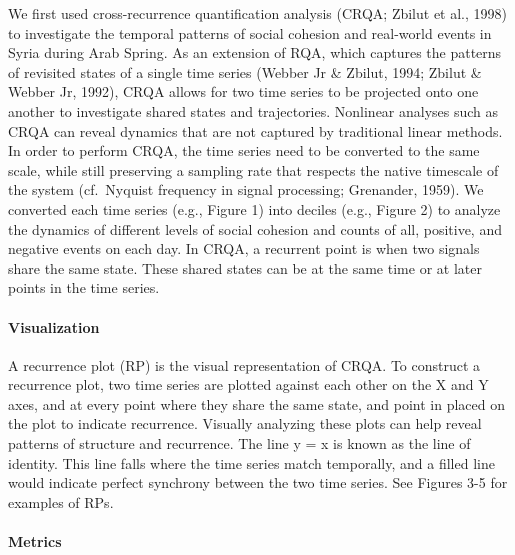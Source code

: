\documentclass[english,man]{apa6}
\begin{document}
We first used cross-recurrence quantification analysis (CRQA; Zbilut et al., 1998) to investigate the temporal patterns of social cohesion and real-world events in Syria during Arab Spring. As an extension of RQA, which captures the patterns of revisited states of a single time series (Webber Jr \& Zbilut, 1994; Zbilut \& Webber Jr, 1992), CRQA allows for two time series to be projected onto one another to investigate shared states and trajectories. Nonlinear analyses such as CRQA can reveal dynamics that are not captured by traditional linear methods. In order to perform CRQA, the time series need to be converted to the same scale, while still preserving a sampling rate that respects the native timescale of the system (cf.~Nyquist frequency in signal processing; Grenander, 1959). We converted each time series (e.g., Figure 1) into deciles (e.g., Figure 2) to analyze the dynamics of different levels of social cohesion and counts of all, positive, and negative events on each day. In CRQA, a recurrent point is when two signals share the same state. These shared states can be at the same time or at later points in the time series.

\hypertarget{visualization}{%
\paragraph{Visualization}\label{visualization}}

A recurrence plot (RP) is the visual representation of CRQA. To construct a recurrence plot, two time series are plotted against each other on the X and Y axes, and at every point where they share the same state, and point in placed on the plot to indicate recurrence. Visually analyzing these plots can help reveal patterns of structure and recurrence. The line y = x is known as the line of identity. This line falls where the time series match temporally, and a filled line would indicate perfect synchrony between the two time series. See Figures 3-5 for examples of RPs.

\hypertarget{metrics}{%
\paragraph{Metrics}\label{metrics}}
\end{document}
